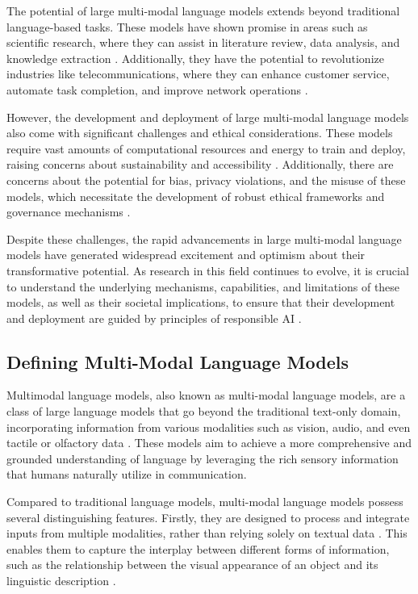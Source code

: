 \documentclass[11pt]{article}
\begin{document}
The potential of large multi-modal language models extends beyond traditional language-based tasks. These models have shown promise in areas such as scientific research, where they can assist in literature review, data analysis, and knowledge extraction \cite{ref11}. Additionally, they have the potential to revolutionize industries like telecommunications, where they can enhance customer service, automate task completion, and improve network operations \cite{ref12}.

However, the development and deployment of large multi-modal language models also come with significant challenges and ethical considerations. These models require vast amounts of computational resources and energy to train and deploy, raising concerns about sustainability and accessibility \cite{ref13}. Additionally, there are concerns about the potential for bias, privacy violations, and the misuse of these models, which necessitate the development of robust ethical frameworks and governance mechanisms \cite{ref14}.

Despite these challenges, the rapid advancements in large multi-modal language models have generated widespread excitement and optimism about their transformative potential. As research in this field continues to evolve, it is crucial to understand the underlying mechanisms, capabilities, and limitations of these models, as well as their societal implications, to ensure that their development and deployment are guided by principles of responsible AI \cite{ref15}.

\subsection{Defining Multi-Modal Language Models}

Multimodal language models, also known as multi-modal language models, are a class of large language models that go beyond the traditional text-only domain, incorporating information from various modalities such as vision, audio, and even tactile or olfactory data \cite{ref16,ref17}. These models aim to achieve a more comprehensive and grounded understanding of language by leveraging the rich sensory information that humans naturally utilize in communication.

Compared to traditional language models, multi-modal language models possess several distinguishing features. Firstly, they are designed to process and integrate inputs from multiple modalities, rather than relying solely on textual data \cite{ref18}. This enables them to capture the interplay between different forms of information, such as the relationship between the visual appearance of an object and its linguistic description \cite{ref19}.
\end{document}
